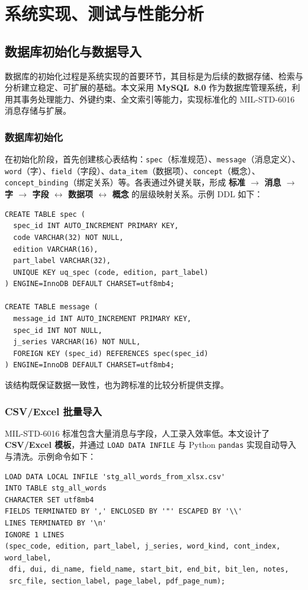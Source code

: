 \chapter{系统实现、测试与性能分析}
\section{数据库初始化与数据导入}\label{sec:init-import}

数据库的初始化过程是系统实现的首要环节，其目标是为后续的数据存储、检索与分析建立稳定、可扩展的基础。本文采用 \textbf{MySQL~8.0} 作为数据库管理系统，利用其事务处理能力、外键约束、全文索引等能力，实现标准化的 MIL-STD-6016 消息存储与扩展。

\subsection{数据库初始化}
在初始化阶段，首先创建核心表结构：\texttt{spec}（标准规范）、\texttt{message}（消息定义）、\texttt{word}（字）、\texttt{field}（字段）、\texttt{data\_item}（数据项）、\texttt{concept}（概念）、\texttt{concept\_binding}（绑定关系）等。各表通过外键关联，形成 \textbf{标准 $\rightarrow$ 消息 $\rightarrow$ 字 $\rightarrow$ 字段 $\leftrightarrow$ 数据项 $\leftrightarrow$ 概念} 的层级映射关系。示例 DDL 如下：

\begin{verbatim}
CREATE TABLE spec (
  spec_id INT AUTO_INCREMENT PRIMARY KEY,
  code VARCHAR(32) NOT NULL,
  edition VARCHAR(16),
  part_label VARCHAR(32),
  UNIQUE KEY uq_spec (code, edition, part_label)
) ENGINE=InnoDB DEFAULT CHARSET=utf8mb4;

CREATE TABLE message (
  message_id INT AUTO_INCREMENT PRIMARY KEY,
  spec_id INT NOT NULL,
  j_series VARCHAR(16) NOT NULL,
  FOREIGN KEY (spec_id) REFERENCES spec(spec_id)
) ENGINE=InnoDB DEFAULT CHARSET=utf8mb4;
\end{verbatim}

该结构既保证数据一致性，也为跨标准的比较分析提供支撑。

\subsection{CSV/Excel 批量导入}
MIL-STD-6016 标准包含大量消息与字段，人工录入效率低。本文设计了 \textbf{CSV/Excel 模板}，并通过 \texttt{LOAD DATA INFILE} 与 Python \texttt{pandas} 实现自动导入与清洗。示例命令如下：

\begin{verbatim}
LOAD DATA LOCAL INFILE 'stg_all_words_from_xlsx.csv'
INTO TABLE stg_all_words
CHARACTER SET utf8mb4
FIELDS TERMINATED BY ',' ENCLOSED BY '"' ESCAPED BY '\\'
LINES TERMINATED BY '\n'
IGNORE 1 LINES
(spec_code, edition, part_label, j_series, word_kind, cont_index, word_label,
 dfi, dui, di_name, field_name, start_bit, end_bit, bit_len, notes,
 src_file, section_label, page_label, pdf_page_num);
\end{verbatim}

